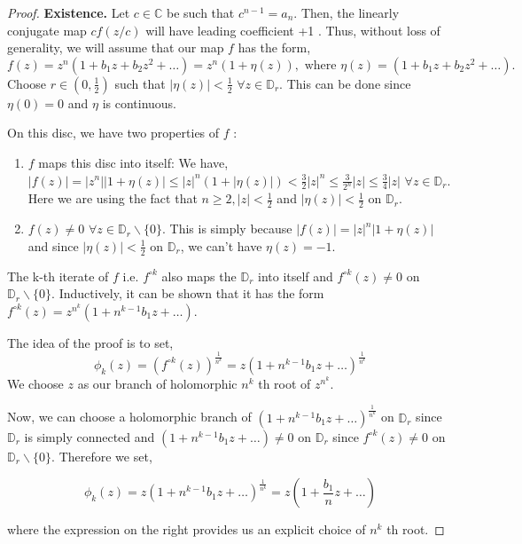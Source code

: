 \begin{proof}
	\textbf{Existence.} Let $c \in \mathbb{C}$ be such that $c^{n-1}=a_{n}$. Then, the linearly conjugate map $c f(z / c)$ will have leading coefficient +1 . Thus, without loss of generality, we will assume that our map $f$ has the form, $$f(z)=z^{n}(1+b_{1} z+b_{2} z^{2}+\ldots)=z^{n}(1+\eta(z)), \text{ where }\eta(z)=\left(1+b_{1} z+b_{2} z^{2}+\ldots\right).$$
Choose $r \in\left(0, \frac{1}{2}\right)$ such that $|\eta(z)|<\frac{1}{2}\,\, \forall z \in \mathbb{D}_{r}$. This can be done since $\eta(0)=0$ and $\eta$ is continuous.

\noindent On this disc, we have two properties of $f$ :
\begin{enumerate}
  \item $f$ maps this disc into itself:
	We have, $|f(z)|=\left|z^{n}\right||1+\eta(z)| \leq|z|^{n}(1+|\eta(z)|)<\frac{3}{2}|z|^{n} \leq \frac{3}{2^{n}}|z| \leq \frac{3}{4}|z|$ $\forall z \in \mathbb{D}_{r}$. Here we are using the fact that $n \geq 2,|z|<\frac{1}{2}$ and $|\eta(z)|<\frac{1}{2}$ on $\mathbb{D}_{r}$.
  \item $f(z) \neq 0\,\, \forall z \in \mathbb{D}_{r} \backslash\{0\}.$
This is simply because $|f(z)|=|z|^{n}|1+\eta(z)|$ and since $|\eta(z)|<\frac{1}{2}$ on $\mathbb{D}_{r}$, we can't have $\eta(z)=-1$.
\end{enumerate}

\noindent The k-th iterate of $f$ i.e. $f^{\circ k}$ also maps the $\mathbb{D}_{r}$ into itself and $f^{\circ k}(z) \neq 0$ on $\mathbb{D}_{r} \backslash\{0\}$. Inductively, it can be shown that it has the form $f^{\circ k}(z)=z^{n^{k}}\left(1+n^{k-1} b_{1} z+\ldots\right)$.

The idea of the proof is to set,
$$
\phi_{k}(z)=\left(f^{\circ k}(z)\right)^{\frac{1}{n^{k}}}=z\left(1+n^{k-1} b_{1} z+\ldots\right)^{\frac{1}{n^{k}}}
$$
We choose $z$ as our branch of holomorphic $n^{k}$ th root of $z^{n^{k}}$.

Now, we can choose a holomorphic branch of $\left(1+n^{k-1} b_{1} z+\ldots\right)^{\frac{1}{n^{k}}}$ on $\mathbb{D}_{r}$ since $\mathbb{D}_{r}$ is simply connected and $\left(1+n^{k-1} b_{1} z+\ldots\right) \neq 0$ on $\mathbb{D}_{r}$ since $f^{\circ k}(z) \neq 0$ on $\mathbb{D}_{r} \backslash\{0\}$. Therefore we set,

$$
\phi_{k}(z)=z\left(1+n^{k-1} b_{1} z+\ldots\right)^{\frac{1}{n^{k}}}=z\left(1+\frac{b_{1}}{n} z+\ldots\right)
$$

where the expression on the right provides us an explicit choice of $n^{k}$ th root.


\end{proof}
